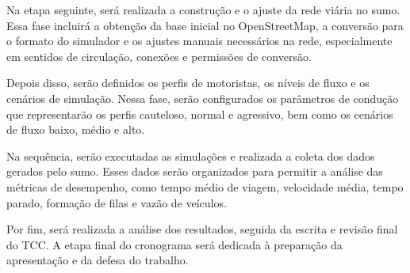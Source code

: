 Na etapa seguinte, será realizada a construção e o ajuste da rede viária no \gls{sumo}. Essa fase incluirá a obtenção da base inicial no OpenStreetMap, a conversão para o formato do simulador e os ajustes manuais necessários na rede, especialmente em sentidos de circulação, conexões e permissões de conversão.

Depois disso, serão definidos os perfis de motoristas, os níveis de fluxo e os cenários de simulação. Nessa fase, serão configurados os parâmetros de condução que representarão os perfis cauteloso, normal e agressivo, bem como os cenários de fluxo baixo, médio e alto.

Na sequência, serão executadas as simulações e realizada a coleta dos dados gerados pelo \gls{sumo}. Esses dados serão organizados para permitir a análise das métricas de desempenho, como tempo médio de viagem, velocidade média, tempo parado, formação de filas e vazão de veículos.

Por fim, será realizada a análise dos resultados, seguida da escrita e revisão final do TCC. A etapa final do cronograma será dedicada à preparação da apresentação e da defesa do trabalho.